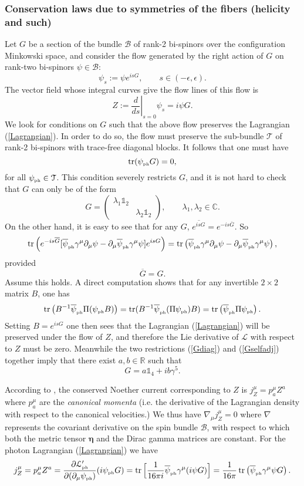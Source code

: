 \documentclass[11pt]{article}
\theoremstyle{definition}
\DeclareMathOperator{\tr}{tr}
\newcommand{\refeq}[1]{(\ref{#1})}
\numberwithin{equation}{section}
\newcommand{\beq}{\begin{equation}}
\newcommand{\eeq}{\end{equation}}
\newcommand{\Id}{\mathds{1}}
\newcommand{\p}{\partial}
\newcommand{\cB}{\mathcal{B}}
\newcommand{\cL}{{\mathcal L}}
\newcommand{\cLph}{{\mathcal L}_{\mbox{\tiny{ph}}}}
\newcommand{\cT}{\mathcal{T}}
\newcommand{\psiPH}{{\psi_{\mbox{\rm\tiny ph}}}}
\newcommand{\psiPHb}{{\overline\psi_{\mbox{\rm\tiny ph}}}}
\newcommand{\Cset}{{\mathbb C}}
\newcommand{\Rset}{{\mathbb R}}
\newcommand{\la}{\lambda}
\newcommand{\ga}{\gamma}
\newcommand{\ep}{\epsilon}
\newcommand{\nab}{\nabla}
\begin{document}
\subsubsection{Conservation laws due to symmetries of the fibers (helicity and such)}
 Let $G$ be a section of the bundle $\cB$ of rank-2 bi-spinors over the configuration Minkowski space, and consider the flow generated by the right 
action 
of $G$ on rank-two bi-spinors $\psi \in \cB$:
\beq 
\psi_s := \psi e^{isG},\qquad s \in (-\ep,\ep).
\eeq
 The vector field whose integral curves give the flow lines of this flow is
\beq 
Z := \left.\frac{d}{ds}\right|_{s=0} \psi_s = i \psi G.
\eeq
We look for conditions on $G$ such that the above flow preserves the Lagrangian \refeq{Lagrangian}. 
 In order to do so, the flow must preserve the sub-bundle $\cT$ of rank-2 bi-spinors with trace-free diagonal blocks.  
It follows that one must have 
\beq  \tr (\psiPH G ) = 0,
\eeq for all $\psiPH \in \cT$.  This condition severely restricts $G$, and it is not hard to check that $G$ can only be of the form
\beq \label{Gdiag} G = \left(\begin{array}{cc} \la_1 \Id_2 & \\ & \la_2 \Id_2 \end{array}\right),\qquad \la_1,\la_2 \in \Cset.
\eeq
On the other hand, it is easy to see that for any $G$, $\overline{e^{isG}} = e^{-is\overline{G}}$. 
 So
\beq 
 \tr\left( e^{-is\overline{G}} [ \psiPHb\ga^\mu \p_\mu \psi -  \p_\mu \psiPHb \ga^\mu \psi ] e^{isG} \right) =  \tr\left( \psiPHb\ga^\mu \p_\mu \psi -  \p_\mu \psiPHb \ga^\mu \psi \right),
\eeq
provided 
\beq \label{Gselfadj}\overline{G} = G.
\eeq
 Assume this holds. 
 A direct computation shows that for any invertible $2\times 2$ matrix $B$, one has
\beq 
\tr \left( B^{-1} \psiPHb \Pi (\psiPH B)\right) = \tr (B^{-1} \psiPHb (\Pi\psiPH)B) = \tr \left(\psiPHb \Pi \psiPH\right). 
\eeq
 Setting $B = e^{isG}$ one then sees that the Lagrangian \refeq{Lagrangian} will be preserved under the flow of $Z$, and 
therefore the Lie derivative of $\cL$ with respect to $Z$ must be zero. 
 Meanwhile the two restrictions \refeq{Gdiag} and \refeq{Gselfadj} together imply that there exist $a,b\in\Rset$ such that
\beq 
G = a \Id_4 + i b \ga^5.
\eeq

 According to \cite{Chr2000}, the conserved Noether current corresponding to $Z$ is $j_Z^\mu = p^\mu_a Z^a$ where $p^\mu_a$ are 
the {\em canonical momenta} (i.e. the derivative of the Lagrangian density with respect to the canonical velocities.)
 We thus have $\nab_\mu j_Z^\mu = 0 $ where $\nab$ represents the covariant derivative on the spin bundle $\cB$, with respect to 
which both the metric tensor $\boldsymbol{\eta}$ and the Dirac gamma matrices are constant. 
 For the photon Lagrangian \refeq{Lagrangian} we have
\beq \label{helicityCURRENT}
j_Z^\mu = p^\mu_a Z^a = \frac{\p \cLph'}{\p(\p_\mu \psiPH)}(i\psiPH G) =  \tr\Big[\frac{1}{16 \pi i} \psiPHb \ga^\mu (i \psi G)\Big] =
 \frac{1}{16 \pi}\tr\left(\psiPHb\ga^\mu \psi G\right).
\eeq
\end{document}
